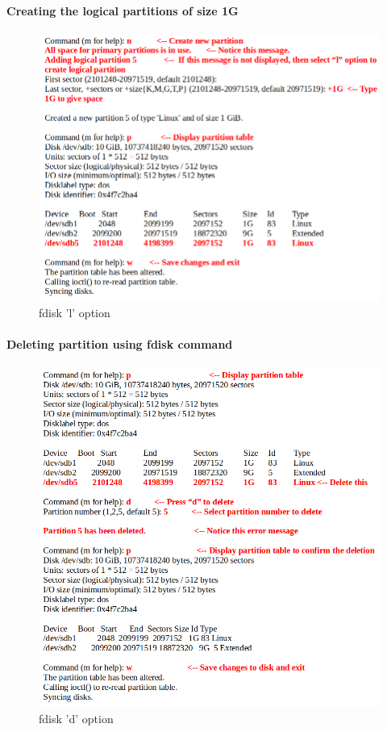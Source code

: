 \begin{flushleft}
\newpage
\paragraph{Creating the logical partitions of size 1G}

\begin{figure}[h!]
	\centering
	\includegraphics[scale=.5]{content/chapter8/images/fdisk5.png}
	\caption{fdisk 'l' option}
	\label{l_option}
\end{figure}		

\newpage

\paragraph{Deleting partition using fdisk command}
\begin{figure}[h!]
	\centering
	\includegraphics[scale=.5]{content/chapter8/images/fdisk6.png}
	\caption{fdisk 'd' option}
	\label{d_option}
\end{figure}		



\end{flushleft}

\newpage

